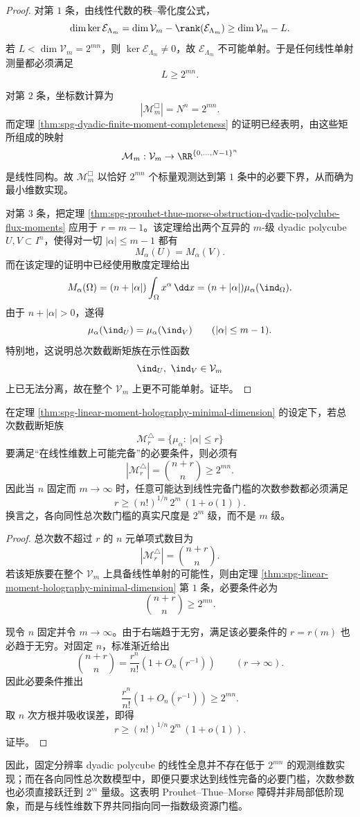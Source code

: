 \begin{proof}
对第 \(1\) 条，由线性代数的秩--零化度公式，
\[
\dim\ker \mathcal E_{\Lambda_m}
=
\dim \mathcal V_m-\rank(\mathcal E_{\Lambda_m})
\ge
\dim \mathcal V_m-L.
\]
若 \(L<\dim \mathcal V_m=2^{mn}\)，则 \(\ker \mathcal E_{\Lambda_m}\neq 0\)，故 \(\mathcal E_{\Lambda_m}\) 不可能单射。于是任何线性单射测量都必须满足
\[
L\ge 2^{mn}.
\]

对第 \(2\) 条，坐标数计算为
\[
|\mathcal M_m^{\Box}|=N^n=2^{mn}.
\]
而定理 \ref{thm:spg-dyadic-finite-moment-completeness} 的证明已经表明，由这些矩所组成的映射
\[
\mathcal M_m:\mathcal V_m\to \RR^{\{0,\dots,N-1\}^{n}}
\]
是线性同构。故 \(\mathcal M_m^{\Box}\) 以恰好 \(2^{mn}\) 个标量观测达到第 \(1\) 条中的必要下界，从而确为最小维数实现。

对第 \(3\) 条，把定理 \ref{thm:spg-prouhet-thue-morse-obstruction-dyadic-polyclube-flux-moments} 应用于 \(r=m-1\)。该定理给出两个互异的 \(m\)-级 dyadic polycube \(U,V\subset I^n\)，使得对一切 \(|\alpha|\le m-1\) 都有
\[
M_\alpha(U)=M_\alpha(V).
\]
而在该定理的证明中已经使用散度定理给出
\[
M_\alpha(\Omega)=(n+|\alpha|)\int_\Omega x^\alpha\,\dd x
=(n+|\alpha|)\mu_\alpha(\ind_\Omega).
\]
由于 \(n+|\alpha|>0\)，遂得
\[
\mu_\alpha(\ind_U)=\mu_\alpha(\ind_V)
\qquad (|\alpha|\le m-1).
\]
特别地，这说明总次数截断矩族在示性函数
\[
\ind_U,\ \ind_V\in \mathcal V_m
\]
上已无法分离，故在整个 \(\mathcal V_m\) 上更不可能单射。证毕。
\end{proof}

\begin{corollary}\label{cor:spg-total-degree-moment-threshold-exponential-scale}
在定理 \ref{thm:spg-linear-moment-holography-minimal-dimension} 的设定下，若总次数截断矩族
\[
\mathcal M_r^{\triangle}
=
\{\mu_\alpha:\ |\alpha|\le r\}
\]
要满足“在线性维数上可能完备”的必要条件，则必须有
\[
|\mathcal M_r^{\triangle}|=\binom{n+r}{n}\ge 2^{mn}.
\]
因此当 \(n\) 固定而 \(m\to\infty\) 时，任意可能达到线性完备门槛的次数参数都必须满足
\[
r\ge (n!)^{1/n}\,2^m\,(1+o(1)).
\]
换言之，各向同性总次数门槛的真实尺度是 \(2^m\) 级，而不是 \(m\) 级。
\end{corollary}
\begin{proof}
总次数不超过 \(r\) 的 \(n\) 元单项式数目为
\[
|\mathcal M_r^{\triangle}|=\binom{n+r}{n}.
\]
若该矩族要在整个 \(\mathcal V_m\) 上具备线性单射的可能性，则由定理 \ref{thm:spg-linear-moment-holography-minimal-dimension} 第 \(1\) 条，必要条件必为
\[
\binom{n+r}{n}\ge 2^{mn}.
\]

现令 \(n\) 固定并令 \(m\to\infty\)。由于右端趋于无穷，满足该必要条件的 \(r=r(m)\) 也必趋于无穷。对固定 \(n\)，标准渐近给出
\[
\binom{n+r}{n}
=
\frac{r^n}{n!}\left(1+O_n(r^{-1})\right)
\qquad (r\to\infty).
\]
因此必要条件推出
\[
\frac{r^n}{n!}\left(1+O_n(r^{-1})\right)\ge 2^{mn}.
\]
取 \(n\) 次方根并吸收误差，即得
\[
r\ge (n!)^{1/n}\,2^m\,(1+o(1)).
\]
证毕。
\end{proof}

\noindent
因此，固定分辨率 dyadic polycube 的线性全息并不存在低于 \(2^{mn}\) 的观测维数实现；而在各向同性总次数模型中，即便只要求达到线性完备的必要门槛，次数参数也必须直接跃迁到 \(2^m\) 量级。这表明 Prouhet--Thue--Morse 障碍并非局部低阶现象，而是与线性维数下界共同指向同一指数级资源门槛。

\endinput
